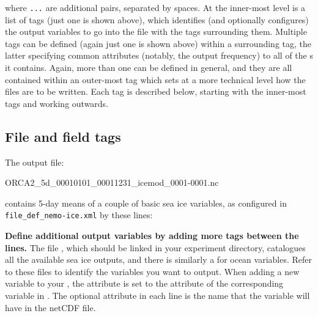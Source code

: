 where \texttt{...} are additional  pairs, separated by spaces.
At the inner-most level is a list of  tags (just one is shown above), which identifies (and optionally configures) the output variables to go into the file with the  tags surrounding them.
Multiple  tags can be defined (again just one is shown above) within a surrounding  tag, the latter specifying common attributes (notably, the output frequency) to all of the s it contains.
Again, more than one  can be defined in general, and they are all contained within an outer-most  tag which sets at a more technical level how the files are to be written.
Each tag is described below, starting with the inner-most tags and working outwards.

\clearpage
\subsection{File and field tags}
\label{sec:outputs-field-tag}

The output file:
\begin{VerbatimFile}
ORCA2_5d_00010101_00011231_icemod_0001-0001.nc
\end{VerbatimFile}

contains 5-day means of a couple of basic sea ice variables, as configured in \texttt{file_def_nemo-ice.xml} by these lines:

\begingroup\small
\begin{VerbatimXML}
\end{VerbatimXML}
\endgroup

\textbf{Define additional output variables by adding more  tags between the  lines.}
The file , which should be linked in your experiment directory, catalogues all the available sea ice outputs, and there is similarly a  for ocean variables.
Refer to these files to identify the variables you want to output.
When adding a new variable to your , the  attribute is set to the  attribute of the corresponding variable in .
The optional  attribute in each  line is the name that the variable will have in the netCDF file.

